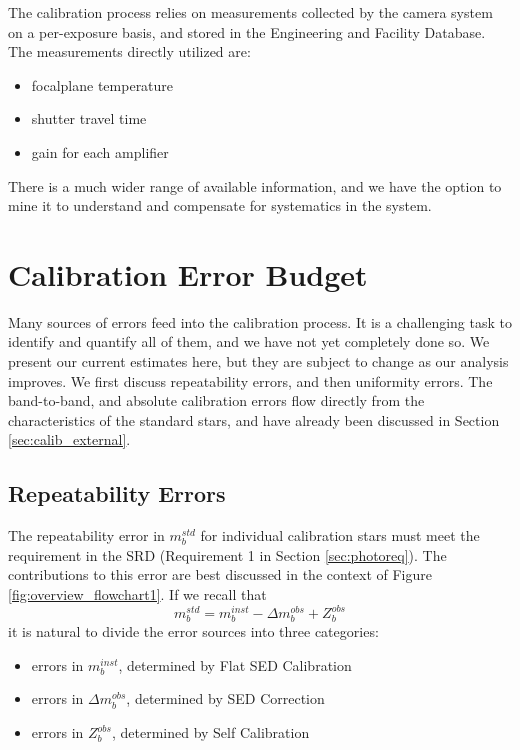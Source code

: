 \documentclass[12pt,preprint]{aastex}
\begin{document}
The calibration process relies on measurements collected by the camera system on a per-exposure basis, and stored in
the Engineering and Facility Database.  The measurements directly utilized are:

\begin{itemize}
\item focalplane temperature
\item shutter travel time
\item gain for each amplifier
\end{itemize}

There is a much wider range of available information, and we have the option to mine it to understand and compensate
for systematics in the system.














\section{Calibration Error Budget}
\label{sec:error_budget}
Many sources of errors feed into the calibration process.  It is a challenging task to identify and quantify all of them, and we have not yet completely done so.  We present our current estimates here, but they are subject to change as our analysis improves. We first
discuss repeatability errors, and then uniformity errors.   The band-to-band, and absolute calibration errors flow directly from the characteristics of the standard stars, and have already been discussed in Section \ref{sec:calib_external}.
\subsection{Repeatability Errors}
\label{sec:rpterrs}
The repeatability error in $m_b^{std}$ for individual calibration stars must meet the requirement in the SRD (Requirement 1 in Section \ref{sec:photoreq}).  The contributions to this error are best discussed in the context of Figure \ref{fig:overview_flowchart1}.  If we recall that
\begin{equation}
m_b^{std} = m_b^{inst} - \Delta m_b^{obs} + Z_b^{obs}
\end{equation}
it is natural to divide the error sources into three categories:

\begin{itemize}
\item{errors in $m_b^{inst}$, determined by Flat SED Calibration}
\item{errors in $\Delta m_b^{obs}$, determined by SED Correction}
\item{errors in $Z_b^{obs}$, determined by Self Calibration}
\end{itemize}
\end{document}
